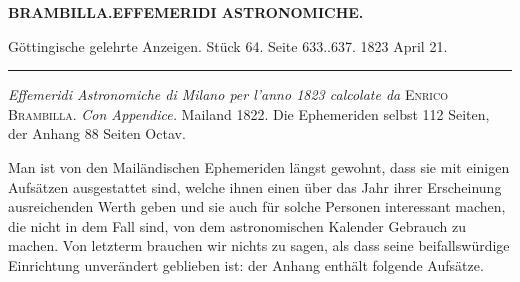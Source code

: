 \clearpage
\begingroup
\pagestyle{empty}
\newcommand{\GaussVIGathering}[1]{%
  \fancypagestyle{gaussVIGathering}{%
    \fancyhf{}%
    \renewcommand{\headrulewidth}{0pt}%
    \renewcommand{\footrulewidth}{0pt}%
    \fancyfoot[C]{\makebox[\textwidth][l]{%
      \hspace*{.025\textwidth}{\footnotesize\bfseries VI.}\hfill
      {\normalsize\bfseries\textls[90]{#1}}\hspace*{.18\textwidth}}}%
  }%
  \thispagestyle{gaussVIGathering}%
}
\thispagestyle{empty}
\noindent{}%
\makebox[12mm][l]{}%
\parbox[t]{\dimexpr\linewidth-24mm\relax}{\centering\footnotesize\bfseries BRAMBILLA.\enspace EFFEMERIDI ASTRONOMICHE.\par}%
\par\medskip
\begin{center}\small Göttingische gelehrte Anzeigen. Stück 64. Seite 633..637. 1823 April 21.\\[3pt]\rule{.72\linewidth}{.3pt}\end{center}

\emph{Effemeridi Astronomiche di Milano per l'anno \textup{1823} calcolate da} \textsc{Enrico Brambilla}. \emph{Con Appendice.} Mailand 1822. Die Ephemeriden selbst 112 Seiten, der Anhang 88 Seiten Octav.

Man ist von den Mailändischen Ephemeriden längst gewohnt, dass sie mit einigen Aufsätzen ausgestattet sind, welche ihnen einen über das Jahr ihrer Erscheinung ausreichenden Werth geben und sie auch für solche Personen interessant machen, die nicht in dem Fall sind, von dem astronomischen Kalender Gebrauch zu machen. Von letzterm brauchen wir nichts zu sagen, als dass seine beifallswürdige Einrichtung unverändert geblieben ist: der Anhang enthält folgende Aufsätze.

